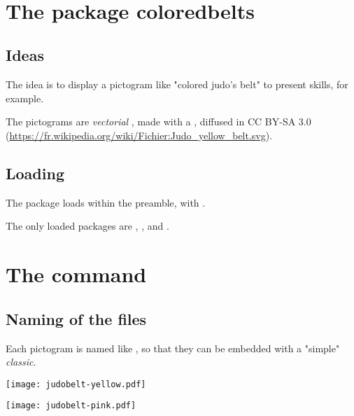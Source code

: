 \documentclass[english,11pt,a4paper]{article}
\begin{document}
\vfill~

\pagebreak

\section{The package coloredbelts}

\subsection{Ideas}

The idea is to display a pictogram like "colored judo's belt" to present skills, for example.

\medskip

The pictograms are \textit{vectorial} , made with a , diffused in CC BY-SA 3.0 (\url{https://fr.wikipedia.org/wiki/Fichier:Judo_yellow_belt.svg}).

\subsection{Loading}

The package loads within the preamble, with .

The only loaded packages are , ,  and .

\begin{codehigh}[language=latex/latex2,style/main=cyan!10,style/code=cyan!10]
\usepackage{coloredbelts}
\end{codehigh}

\section{The command}

\subsection{Naming of the files}

Each pictogram is named like , so that they can be embedded with a "simple"  \textit{classic}.

\begin{demohigh}[language=latex/latex3,style/main=cyan!10,style/code=cyan!10,style/demo=cyan!10]
\texttt{[image: judobelt-yellow.pdf]}\par
\texttt{[image: judobelt-pink.pdf]}
\end{demohigh}
\end{document}
